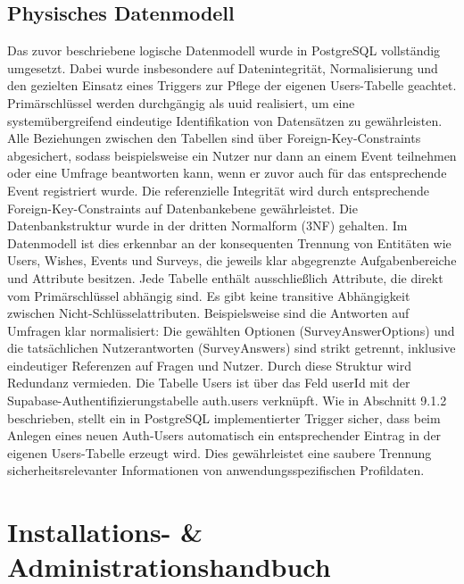 \documentclass[a4paper,12pt]{article}
\begin{document}

\subsection{Physisches Datenmodell}
Das zuvor beschriebene logische Datenmodell wurde in PostgreSQL vollständig umgesetzt. Dabei wurde insbesondere auf Datenintegrität, Normalisierung und den gezielten Einsatz eines Triggers zur Pflege der eigenen Users-Tabelle geachtet. Primärschlüssel werden durchgängig als uuid realisiert, um eine systemübergreifend eindeutige Identifikation von Datensätzen zu gewährleisten. Alle Beziehungen zwischen den Tabellen sind über Foreign-Key-Constraints abgesichert, sodass beispielsweise ein Nutzer nur dann an einem Event teilnehmen oder eine Umfrage beantworten kann, wenn er zuvor auch für das entsprechende Event registriert wurde. Die referenzielle Integrität wird durch entsprechende Foreign-Key-Constraints auf Datenbankebene gewährleistet. Die Datenbankstruktur wurde in der dritten Normalform (3NF) gehalten. Im Datenmodell ist dies erkennbar an der konsequenten Trennung von Entitäten wie Users, Wishes, Events und Surveys, die jeweils klar abgegrenzte Aufgabenbereiche und Attribute besitzen. Jede Tabelle enthält ausschließlich Attribute, die direkt vom Primärschlüssel abhängig sind. Es gibt keine transitive Abhängigkeit zwischen Nicht-Schlüsselattributen. Beispielsweise sind die Antworten auf Umfragen klar normalisiert: Die gewählten Optionen (SurveyAnswerOptions) und die tatsächlichen Nutzerantworten (SurveyAnswers) sind strikt getrennt, inklusive eindeutiger Referenzen auf Fragen und Nutzer. Durch diese Struktur wird Redundanz vermieden. Die Tabelle Users ist über das Feld userId mit der Supabase-Authentifizierungstabelle auth.users verknüpft. Wie in Abschnitt 9.1.2 beschrieben, stellt ein in PostgreSQL implementierter Trigger sicher, dass beim Anlegen eines neuen Auth-Users automatisch ein entsprechender Eintrag in der eigenen Users-Tabelle erzeugt wird. Dies gewährleistet eine saubere Trennung sicherheitsrelevanter Informationen von anwendungsspezifischen Profildaten.

\newpage


\section{Installations- \& Administrationshandbuch}
\end{document}
